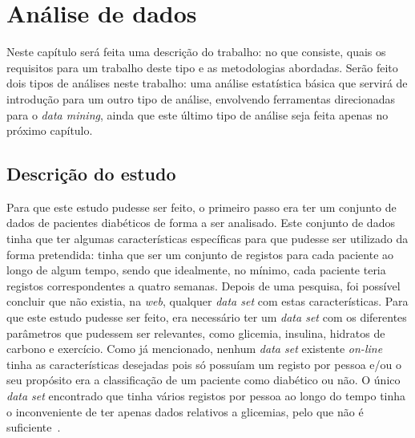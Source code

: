 \chapter{Análise de dados}\label{chap:dese}

Neste capítulo será feita uma descrição do trabalho: no que consiste, quais os requisitos para um trabalho deste tipo e as metodologias abordadas. 
Serão feito dois tipos de análises neste trabalho: uma análise estatística básica que servirá de introdução para um outro tipo de análise, envolvendo ferramentas direcionadas para o \textit{data mining}, ainda que este último tipo de análise seja feita apenas no próximo capítulo.


\section{Descrição do estudo}

Para que este estudo pudesse ser feito, o primeiro passo era ter um conjunto de dados de pacientes diabéticos de forma a ser analisado. Este conjunto de dados tinha que ter algumas características específicas para que pudesse ser utilizado da forma pretendida: tinha que ser um conjunto de registos para cada paciente ao longo de algum tempo, sendo que idealmente, no mínimo, cada paciente teria registos correspondentes a quatro semanas. Depois de uma pesquisa, foi possível concluir que não existia, na \textit{web}, qualquer \textit{data set} com estas características.
Para que este estudo pudesse ser feito, era necessário ter um \textit{data set} com os diferentes parâmetros que pudessem ser relevantes, como glicemia, insulina, hidratos de carbono e exercício. 
Como já mencionado, nenhum \textit{data set} existente \textit{on-line} tinha as características desejadas pois só possuíam um registo por pessoa e/ou o seu propósito era a classificação de um paciente como diabético ou não. O único \textit{data set} encontrado que tinha vários registos por pessoa ao longo do tempo tinha o inconveniente de ter apenas dados relativos a glicemias, pelo que não é suficiente~\cite{dataset2}.

